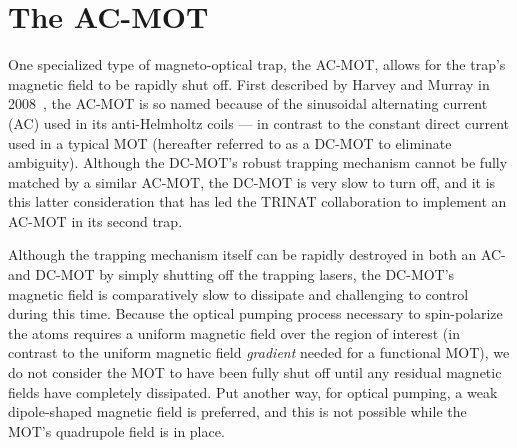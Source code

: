 \section{The AC-MOT}
\label{sec:acmot}
%
One specialized type of magneto-optical trap, the AC-MOT, allows for the trap's magnetic field to be rapidly shut off.  First described by Harvey and Murray in 2008~\cite{harveymurray}, the AC-MOT is so named because of the sinusoidal alternating current (AC) used in its anti-Helmholtz coils --- in contrast to the constant direct current used in a typical MOT (hereafter referred to as a DC-MOT to eliminate ambiguity).  Although the DC-MOT's robust trapping mechanism cannot be fully matched by a similar AC-MOT, the DC-MOT is very slow to turn off, and it is this latter consideration that has led the TRINAT collaboration to implement an AC-MOT in its second trap.


Although the trapping mechanism itself can be rapidly destroyed in both an AC- and DC-MOT by simply shutting off the trapping lasers, the DC-MOT's magnetic field is comparatively slow to dissipate and challenging to control during this time.  Because the optical pumping process 
necessary to spin-polarize the atoms 
requires a uniform magnetic field 
over the region of interest 
(in contrast to the uniform magnetic field \emph{gradient} needed for a functional MOT), we do not consider the MOT to have been fully shut off until any residual magnetic fields have completely dissipated.  
Put another way, 
for optical pumping, a weak dipole-shaped magnetic field is preferred, and this is not possible while the MOT's quadrupole field is in place.  %


